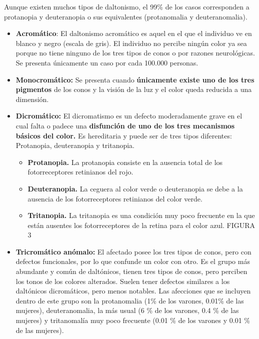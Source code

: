 \documentclass[10pt]{article}
\begin{document}
Aunque existen muchos tipos de daltonismo, el 99\% de los casos corresponden a protanopia y deuteranopia o sus equivalentes (protanomalia y deuteranomalia).

\begin{itemize}
    \item \textbf{Acromático}: El daltonismo acromático es aquel en el que el individuo ve en blanco y negro (escala de gris). El individuo no percibe ningún color ya sea porque no tiene ninguno de los tres tipos de conos o por razones neurológicas. Se presenta únicamente un caso por cada 100.000 personas.
    \item \textbf{Monocromático:} Se presenta cuando \textbf{únicamente existe uno de los tres pigmentos} de los conos y la visión de la luz y el color queda reducida a una dimensión.
    \item \textbf{Dicromático:} El dicromatismo es un defecto moderadamente grave en el cual falta o padece una \textbf{disfunción de uno de los tres mecanismos básicos del color.} Es hereditaria y puede ser de tres tipos diferentes: Protanopia, deuteranopia y tritanopia.

    \begin{itemize}
        \item \textbf{Protanopia.} La protanopia consiste en la ausencia total de los fotorreceptores retinianos del rojo.
        \item \textbf{Deuteranopia.} La ceguera al color verde o deuteranopia se debe a la ausencia de los fotorreceptores retinianos del color verde.
        \item \textbf{Tritanopia.} La tritanopia es una condición muy poco frecuente en la que están ausentes los fotorreceptores de la retina para el color azul. FIGURA 3
    \end{itemize}
    \item \textbf{Tricromático anómalo: } El afectado posee los tres tipos de conos, pero con defectos funcionales, por lo que confunde un color con otro. Es el grupo más abundante y común de daltónicos, tienen tres tipos de conos, pero perciben los tonos de los colores alterados. Suelen tener defectos similares a los daltónicos dicromáticos, pero menos notables. Las afecciones que se incluyen dentro de este grupo son la protanomalia (1\% de los varones, 0.01\% de las mujeres), deuteranomalia, la más usual (6 \% de los varones, 0.4 \% de las mujeres) y tritanomalía muy poco frecuente (0.01 \% de los varones y 0.01 \% de las mujeres)\cite{IEEEreferencias:Ref31}.
\end{itemize}
\end{document}
